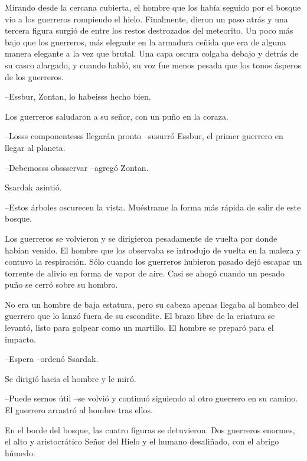 Mirando desde la cercana cubierta, el hombre que los había seguido por el bosque vio a los guerreros rompiendo el hielo. Finalmente, dieron un paso atrás y una tercera figura surgió de entre los restos destrozados del meteorito. Un poco más bajo que los guerreros, más elegante en la armadura ceñida que era de alguna manera elegante a la vez que brutal. Una capa oscura colgaba debajo y detrás de su casco alargado, y cuando habló, su voz fue menos pesada que los tonos ásperos de los guerreros.



--Essbur, Zontan, lo habeisss hecho bien. 



Los guerreros saludaron a su señor, con un puño en la coraza.



--Losss componentesss llegarán pronto --susurró Essbur, el primer guerrero en llegar al planeta.



--Debemosss obssservar --agregó Zontan.



Ssardak asintió.

--Estos árboles oscurecen la vista. Muéstrame la forma más rápida de salir de este bosque.



Los guerreros se volvieron y se dirigieron pesadamente de vuelta por donde habían venido. El hombre que los observaba se introdujo de vuelta en la maleza y contuvo la respiración. Sólo cuando los guerreros hubieron pasado dejó escapar un torrente de alivio en forma de vapor de aire. Casi se ahogó cuando un pesado puño se cerró sobre su hombro.



No era un hombre de baja estatura, pero su cabeza apenas llegaba al hombro del guerrero que lo lanzó fuera de su escondite. El brazo libre de la criatura se levantó, listo para golpear como un martillo. El hombre se preparó para el impacto.



--Espera --ordenó Ssardak. 


Se dirigió hacia el hombre y le miró. 


--Puede sernos útil --se volvió y continuó siguiendo al otro guerrero en su camino. El guerrero arrastró al hombre tras ellos.



En el borde del bosque, las cuatro figuras se detuvieron. Dos guerreros enormes, el alto y aristocrático Señor del Hielo y el humano desaliñado, con el abrigo húmedo.



